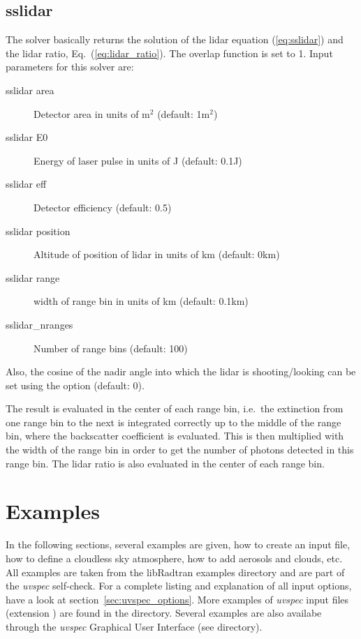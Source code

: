 
\subsection{sslidar}

The solver basically returns the solution of the lidar equation
(\ref{eq:sslidar}) and the lidar ratio,
Eq.~(\ref{eq:lidar_ratio}). The overlap function is set to 1. Input
parameters for this solver are:

\begin{description}
\item[sslidar area] Detector area in units of m$^2$ (default: 1m$^2$)
\item[sslidar E0] Energy of laser pulse in units of J (default: 0.1J) 
\item[sslidar eff] Detector efficiency (default: 0.5)
\item[sslidar position] Altitude of position of lidar in units of km (default: 0km)
\item[sslidar range] width of range bin in units of km (default: 0.1km)
\item[sslidar\_nranges] Number of range bins (default: 100)
\end{description}

Also, the cosine of the nadir angle into which the lidar is
shooting/looking can be set using the option  (default: 0).

The result is evaluated in the center of each range bin, i.e.~the
extinction from one range bin to the next is integrated correctly up
to the middle of the range bin, where the backscatter coefficient is
evaluated. This is then multiplied with the width of the range bin in
order to get the number of photons detected in this range bin. The
lidar ratio is also evaluated in the center of each range bin.

\ifmystic{
  
}

\section{Examples}
\label{sec:examples}

In the following sections, several
examples are given, how to create an input file, how to define a
cloudless sky atmosphere, how to add aerosols and clouds, etc. All
examples are taken from the libRadtran examples directory
and are part of the {\sl uvspec} self-check. For a complete listing
and explanation of all input options, have a look at section~\ref{sec:uvspec_options}.
More examples of {\sl uvspec} input files
(extension ) are found in the 
directory. Several examples are also availabe through the
{\sl uvspec} Graphical User Interface (see  directory).


